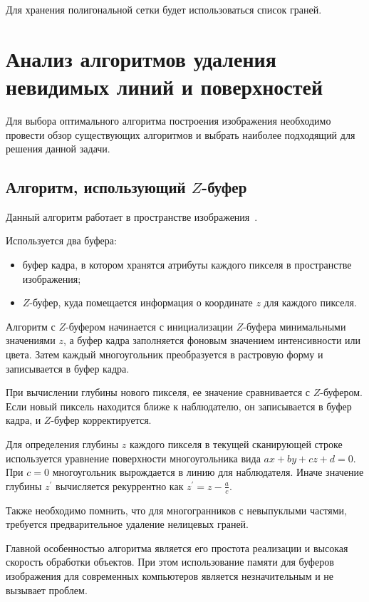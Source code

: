 Для хранения полигональной сетки будет использоваться список граней.


\section{Анализ алгоритмов удаления невидимых линий и поверхностей}

Для выбора оптимального алгоритма построения изображения необходимо провести обзор существующих алгоритмов и выбрать наиболее подходящий для решения данной задачи.


\subsection{Алгоритм, использующий $Z$-буфер}

Данный алгоритм работает в пространстве изображения~\cite{roders}.

Используется два буфера:
\begin{itemize}
	\item буфер кадра, в котором хранятся атрибуты каждого пикселя в пространстве изображения;
	\item $Z$-буфер, куда помещается информация о координате $z$ для каждого пикселя.
\end{itemize}

Алгоритм с $Z$-буфером начинается с инициализации $Z$-буфера минимальными значениями $z$, а буфер кадра заполняется фоновым значением интенсивности или цвета. Затем каждый многоугольник преобразуется в растровую форму и записывается в буфер кадра.

При вычислении глубины нового пикселя, ее значение сравнивается с $Z$-буфером. Если новый пиксель находится ближе к наблюдателю, он записывается в буфер кадра, и $Z$-буфер корректируется.

Для определения глубины $z$ каждого пикселя в текущей сканирующей строке используется уравнение поверхности многоугольника вида $ax + by + cz + d = 0$. При $c = 0$ многоугольник вырождается в линию для наблюдателя. Иначе значение глубины $z^\prime$ вычисляется рекуррентно как $z^\prime = z - \frac{a}{c}$. 

Также необходимо помнить, что для многогранников с невыпуклыми частями, требуется предварительное удаление нелицевых граней.

Главной особенностью алгоритма является его простота реализации и высокая скорость обработки объектов. При этом использование памяти для буферов изображения для современных компьютеров является незначительным и не вызывает проблем.


